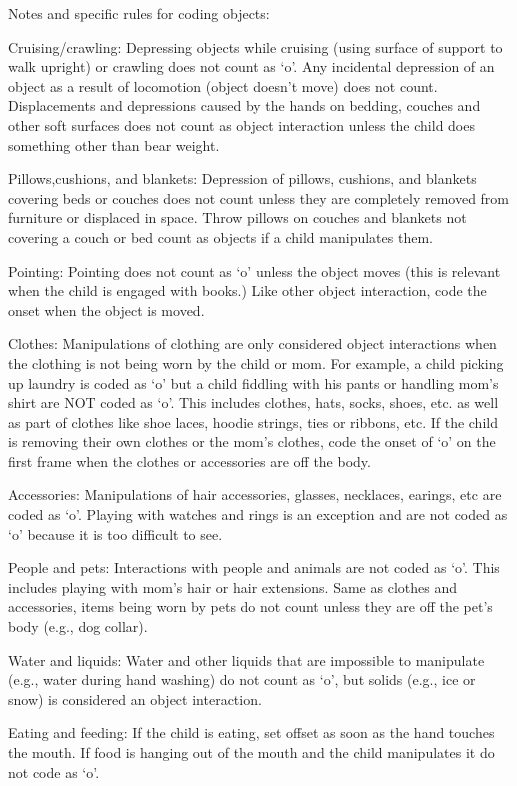 \documentclass[
  12pt,
]{book}
\begin{document}
Notes and specific rules for coding objects:

Cruising/crawling: Depressing objects while cruising (using surface of support to walk upright) or crawling does not count as `o'. Any incidental depression of an object as a result of locomotion (object doesn't move) does not count. Displacements and depressions caused by the hands on bedding, couches and other soft surfaces does not count as object interaction unless the child does something other than bear weight.

Pillows,cushions, and blankets: Depression of pillows, cushions, and blankets covering beds or couches does not count unless they are completely removed from furniture or displaced in space. Throw pillows on couches and blankets not covering a couch or bed count as objects if a child manipulates them.

Pointing: Pointing does not count as `o' unless the object moves (this is relevant when the child is engaged with books.) Like other object interaction, code the onset when the object is moved.

Clothes: Manipulations of clothing are only considered object interactions when the clothing is not being worn by the child or mom. For example, a child picking up laundry is coded as `o' but a child fiddling with his pants or handling mom's shirt are NOT coded as `o'. This includes clothes, hats, socks, shoes, etc. as well as part of clothes like shoe laces, hoodie strings, ties or ribbons, etc. If the child is removing their own clothes or the mom's clothes, code the onset of `o' on the first frame when the clothes or accessories are off the body.

Accessories: Manipulations of hair accessories, glasses, necklaces, earings, etc are coded as `o'. Playing with watches and rings is an exception and are not coded as `o' because it is too difficult to see.

People and pets: Interactions with people and animals are not coded as `o'. This includes playing with mom's hair or hair extensions. Same as clothes and accessories, items being worn by pets do not count unless they are off the pet's body (e.g., dog collar).

Water and liquids: Water and other liquids that are impossible to manipulate (e.g., water during hand washing) do not count as `o', but solids (e.g., ice or snow) is considered an object interaction.

Eating and feeding: If the child is eating, set offset as soon as the hand touches the mouth. If food is hanging out of the mouth and the child manipulates it do not code as `o'.
\end{document}
